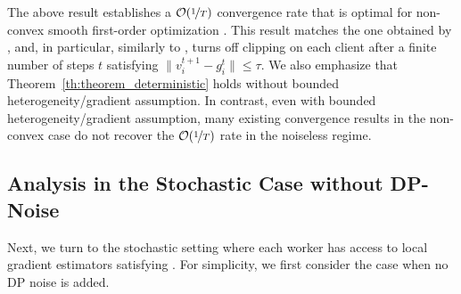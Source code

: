 \documentclass[a4paper,11pt]{article}
\begin{document}
The above result establishes a $\mathcal O(\nicefrac{1}{T})$ convergence rate that is optimal for non-convex smooth first-order optimization \citep{carmon2020lower, carmon2021lower}. This result matches the one obtained by \citet{khirirat2023clip21}, and, in particular, similarly to ,  turns off clipping on each client after a finite number of steps $t$ satisfying $\|v_i^{t+1} - g_i^t\| \leq \tau$. We also emphasize that Theorem~\ref{th:theorem_deterministic} holds without bounded heterogeneity/gradient assumption. In contrast, even with bounded heterogeneity/gradient assumption, many existing convergence results in the non-convex case \citep{liu2022communication, zhang2022understanding, li2023convergence, allouah2024privacy} do not recover the $\mathcal O(\nicefrac{1}{T})$ rate in the noiseless regime.






\subsection{Analysis in the Stochastic Case without DP-Noise}\label{section:stochastic}

Next, we turn to the stochastic setting where each worker has access to local gradient estimators satisfying . For simplicity, we first consider the case when no DP noise is added. 
\end{document}
